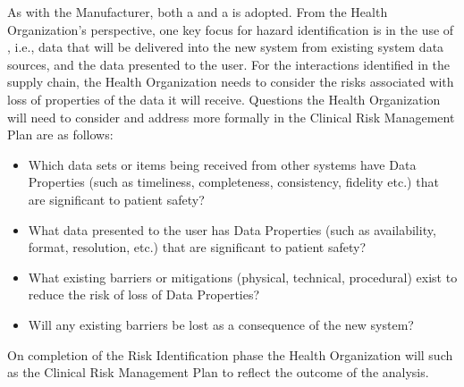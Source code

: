 As with the Manufacturer, both a  and a  is adopted. From the Health Organization's perspective, one key focus for hazard identification is in the use of , i.e., data that will be delivered into the new system from existing system data sources, and the data presented to the user. For the interactions identified in the supply chain, the Health Organization needs to consider the risks associated with loss of properties of the data it will receive. Questions the Health Organization will need to consider and address more formally in the Clinical Risk Management Plan are as follows:
\clearpage%
\begin{itemize}
  \item Which data sets or items being received from other systems have Data Properties (such as timeliness, \gls{completeness}, \gls{consistency}, fidelity etc.) that are significant to patient safety? 
  \item What data presented to the user has Data Properties (such as \gls{availability}, format, resolution, etc.) that are significant to patient safety?
  \item What existing barriers or mitigations (physical, technical, procedural) exist to reduce the risk of loss of Data Properties?
  \item
  Will any existing barriers be lost as a consequence of the new system?
\end{itemize}

On completion of the Risk Identification phase the Health Organization will  such as the Clinical Risk Management Plan to reflect the outcome of the analysis.

